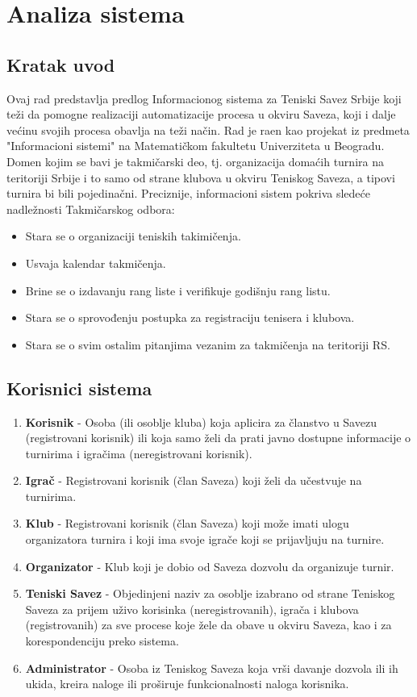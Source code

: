 \documentclass{article}
\begin{document}
\section{Analiza sistema}
\subsection{Kratak uvod}
Ovaj rad predstavlja predlog Informacionog sistema za Teniski Savez Srbije koji teži da pomogne realizaciji automatizacije procesa u okviru Saveza, koji i dalje većinu svojih procesa obavlja na teži način. Rad je ra\dj en kao projekat iz predmeta "Informacioni sistemi" na Matematičkom fakultetu Univerziteta u Beogradu. Domen kojim se bavi je takmičarski deo, tj. organizacija domaćih turnira na teritoriji Srbije i to samo od strane klubova u okviru Teniskog Saveza, a tipovi turnira bi bili pojedinačni. 
Preciznije, informacioni sistem pokriva sledeće nadležnosti Takmičarskog odbora:
\begin{itemize}
\item Stara se o organizaciji teniskih takimičenja.
\item Usvaja kalendar takmičenja.
\item Brine se o izdavanju rang liste i verifikuje godišnju rang listu.
\item Stara se o sprovođenju postupka za registraciju tenisera i klubova.
\item Stara se o svim ostalim pitanjima vezanim za takmičenja na teritoriji RS.   
\end{itemize}


\subsection{Korisnici sistema}
\begin{enumerate}
        \item \textbf{Korisnik} - Osoba (ili osoblje kluba) koja aplicira za članstvo u Savezu (registrovani korisnik) ili koja samo želi da prati javno dostupne informacije o turnirima i igračima (neregistrovani korisnik).
        \item \textbf{Igrač} - Registrovani korisnik (član Saveza) koji želi da učestvuje na turnirima.
        \item \textbf{Klub} - Registrovani korisnik (član Saveza) koji može imati ulogu organizatora turnira i koji ima svoje igrače koji se prijavljuju na turnire. 
        \item \textbf{Organizator} - Klub koji je dobio od Saveza dozvolu da organizuje turnir.
        \item \textbf{Teniski Savez} - Objedinjeni naziv za osoblje izabrano od strane Teniskog Saveza za prijem uživo korisinka (neregistrovanih), igrača i klubova (registrovanih) za sve procese koje žele da obave u okviru Saveza, kao i za korespondenciju preko sistema.
        \item \textbf{Administrator} - Osoba iz Teniskog Saveza koja vrši davanje dozvola ili ih ukida, kreira naloge ili proširuje funkcionalnosti naloga korisnika.

    \end{enumerate}
    
\end{document}

